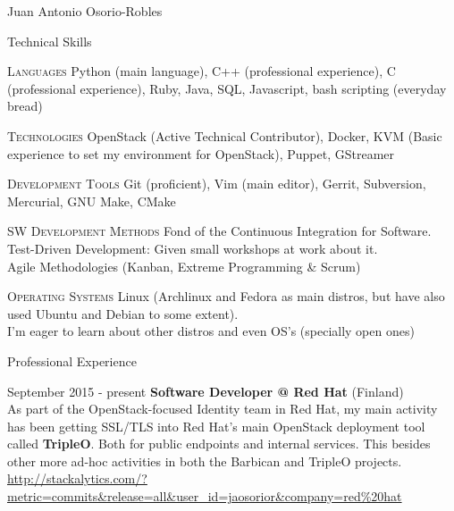 \documentclass[english,10pt,letterpaper]{article}
\begin{document}
\begin{cv}{Juan Antonio Osorio-Robles}
	\begin{cvlist}{Technical Skills}
			\item [\textsc{Languages}]
                Python (main language), C++ (professional experience), C
                (professional experience), Ruby, Java, SQL, Javascript,
                bash scripting (everyday bread)
			\item [\textsc{Technologies}]
                OpenStack (Active Technical Contributor), Docker,
                KVM (Basic experience to set my environment for OpenStack),
                Puppet, GStreamer
			\item [\textsc{Development Tools}]
                Git (proficient), Vim (main editor), Gerrit, Subversion,
                Mercurial, GNU Make, CMake
			\item [\textsc{SW Development Methods}]
				Fond of the Continuous Integration for Software.\\
                Test-Driven Development: Given small workshops at work about
                it.\\
                Agile Methodologies (Kanban, Extreme Programming \& Scrum)
			\item [\textsc{Operating Systems}]
                Linux (Archlinux and Fedora as main distros, but have also
                used Ubuntu and Debian to some extent).\\
                I'm eager to learn about other distros and even OS's (specially
                open ones)
	\end{cvlist}

	\begin{cvlist}{Professional Experience}
		\item [September 2015 - present]
            \textbf{Software Developer @ Red Hat} (Finland)\\
            As part of the OpenStack-focused Identity team in Red Hat, my main
            activity has been getting SSL/TLS into Red Hat's main OpenStack
            deployment tool called \textbf{TripleO}. Both for public endpoints
            and internal services. This besides other more ad-hoc activities
            in both the Barbican and TripleO projects.\\

            \href{http://stackalytics.com/?metric=commits&release=all&user_id=jaosorior&company=red\%20hat}
            {\url{http://stackalytics.com/?metric=commits&release=all&user_id=jaosorior&company=red\%20hat}}


\end{cvlist}
\end{cv}
\end{document}
